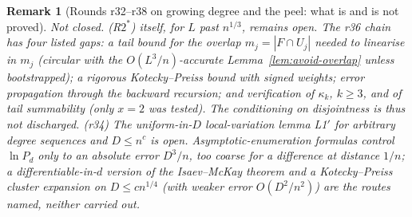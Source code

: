 \documentclass[11pt]{article}
\newtheorem{remark}[theorem]{Remark}
\begin{document}
\begin{remark}[Rounds r32--r38 on growing degree and the peel: what is and is not proved]
\emph{Not closed.}
(R\(2^*\)) itself, for \(L\) past \(n^{1/3}\), remains open. The r36 chain has four
listed gaps: a tail bound for the overlap \(m_j=|F\cap U_j|\) needed to linearise
in \(m_j\) (circular with the \(O(L^3/n)\)-accurate Lemma~\ref{lem:avoid-overlap}
unless bootstrapped); a rigorous Kotecky--Preiss bound with signed weights; error
propagation through the backward recursion; and verification of \(\kappa_k\), \(k\ge3\),
and of tail summability (only \(x=2\) was tested). The conditioning on
disjointness is thus not discharged.
(r34) The uniform-in-\(D\) local-variation lemma L1\('\) for arbitrary degree
sequences and \(D\le n^c\) is open. Asymptotic-enumeration formulas control
\(\ln P_d\) only to an absolute error \(D^3/n\), too coarse for a difference at
distance \(1/n\); a differentiable-in-\(d\) version of the Isaev--McKay theorem and a
Kotecky--Preiss cluster expansion on \(D\le cn^{1/4}\) (with weaker error
\(O(D^2/n^2)\)) are the routes named, neither carried out.
\end{remark}
\end{document}

